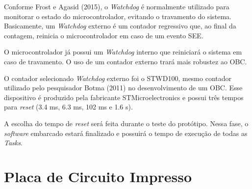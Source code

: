 Conforme  Frost e Agasid (2015), o \textit{Watchdog}  é normalmente utilizado para monitorar o estado do microcontrolador, evitando o travamento do sistema. Basicamente, um \textit{Watchdog} externo é um contador regressivo que, ao final da contagem, reinicia o microcontrolador em caso de um evento SEE. 

O microcontrolador já possui um \textit{Watchdog} interno que reiniciará o sistema em caso de travamento. O uso de um contador externo trará mais robustez ao OBC.

O contador selecionado \textit{Watchdog} externo foi o STWD100, mesmo contador utilizado pelo pesquisador Botma (2011) no desenvolvimento de um OBC. Esse dispositivo é produzido pela fabricante STMicroelectronics e possui três tempos para \textit{reset} (3.4 ms, 6.3 ms, 102 ms e 1.6 s).  

A escolha do tempo de \textit{reset} será feita durante o teste do protótipo. Nessa fase, o \textit{software} embarcado estará finalizado e possuirá o tempo de execução de todas as \textit{Tasks}.

\newpage

\section{Placa de Circuito Impresso}

